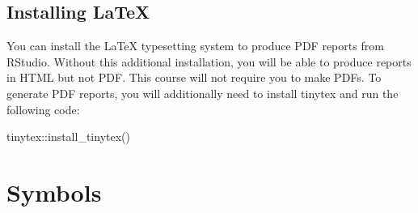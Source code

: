 \documentclass[
  oneside]{book}
\newenvironment{Shaded}{\begin{snugshade}}{\end{snugshade}}
\newcommand{\FunctionTok}[1]{\textcolor[rgb]{0.00,0.00,0.00}{#1}}
\newcommand{\NormalTok}[1]{#1}
\newcommand{\SpecialCharTok}[1]{\textcolor[rgb]{0.00,0.00,0.00}{#1}}
\begin{document}
\hypertarget{installing-latex}{%
\section{Installing LaTeX}\label{installing-latex}}

You can install the LaTeX typesetting system to produce PDF reports from RStudio. Without this additional installation, you will be able to produce reports in HTML but not PDF. This course will not require you to make PDFs. To generate PDF reports, you will additionally need to install tinytex \citep{R-tinytex} and run the following code:

\begin{Shaded}
\begin{Highlighting}[]
\NormalTok{tinytex}\SpecialCharTok{::}\FunctionTok{install\_tinytex}\NormalTok{()}
\end{Highlighting}
\end{Shaded}

\hypertarget{symbols}{%
\chapter{Symbols}\label{symbols}}
\end{document}
